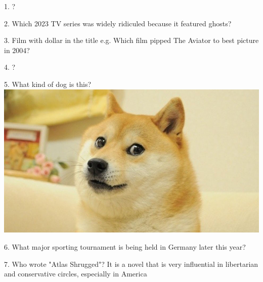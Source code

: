 \begin{frame}
\begin{center}
\Large
1. ?
\end{center}
\end{frame}
\begin{frame}
\begin{center}
\Large
2. Which 2023 TV series was widely ridiculed because it featured ghosts?
\end{center}
\end{frame}
\begin{frame}
\begin{center}
\Large
3. Film with dollar in the title e.g. Which film pipped The Aviator to best picture in 2004?
\end{center}
\end{frame}
\begin{frame}
\begin{center}
\Large
4. ?
\end{center}
\end{frame}
\begin{frame}
\begin{center}
\Large
5. What kind of dog is this?
\\
\vspace{0.5em}\includegraphics[height=0.6\paperheight]{images/doge.jpg}
\end{center}
\end{frame}
\begin{frame}
\begin{center}
\Large
6. What major sporting tournament is being held in Germany later this year?
\end{center}
\end{frame}
\begin{frame}
\begin{center}
\Large
7. Who wrote "Atlas Shrugged"? It is a novel that is very influential in libertarian and conservative circles, especially in America
\end{center}
\end{frame}
